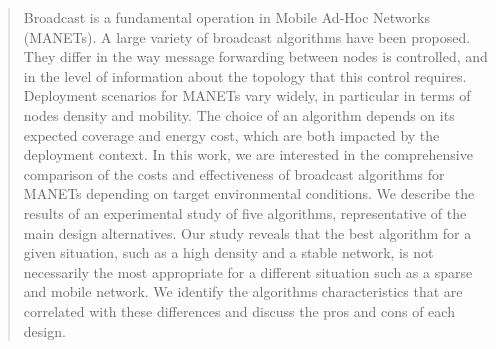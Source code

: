 
\begin{abstract}

Broadcast is a fundamental operation in Mobile Ad-Hoc Networks (MANETs).
A large variety of broadcast algorithms have been proposed. 
They differ in the way message forwarding between nodes is controlled, and in the level of information about the topology that this control requires.
%
Deployment scenarios for MANETs vary widely, in particular in terms of nodes density and mobility.
%
The choice of an algorithm depends on its expected coverage and energy cost, which are both impacted by the deployment context.
%
In this work, we are interested in the comprehensive comparison of the costs and effectiveness of broadcast algorithms for MANETs depending on target environmental conditions.
%
We describe the results of an experimental study of five algorithms, representative of the main design alternatives.
%
Our study reveals that the best algorithm for a given situation, such as a high density and a stable network, is not necessarily the most appropriate for a different situation such as a sparse and mobile network.
We identify the algorithms characteristics that are correlated with these differences and discuss the pros and cons of each design.
%



\end{abstract}


